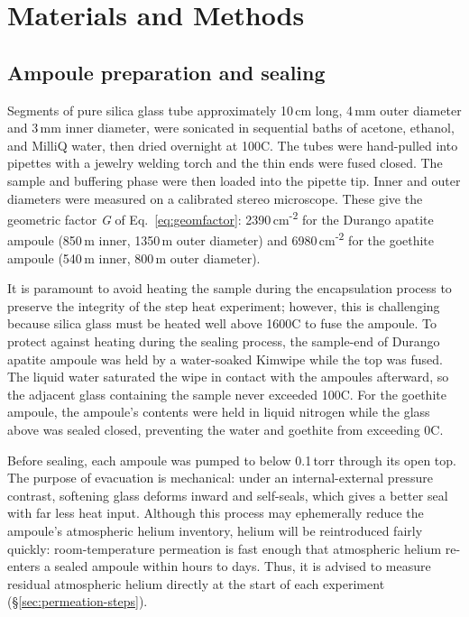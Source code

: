 \section{Materials and Methods}\label{sec:methods}

\subsection{Ampoule preparation and sealing}\label{sec:ampoule-prep}

Segments of pure silica glass tube approximately 10\,cm long, 4\,mm outer diameter and 3\,mm inner diameter, were sonicated in sequential baths of acetone, ethanol, and MilliQ water, then dried overnight at 100\textdegree C. The tubes were hand-pulled into pipettes with a jewelry welding torch and the thin ends were fused closed. The sample and buffering phase were then loaded into the pipette tip. Inner and outer diameters were measured on a calibrated stereo microscope. These give the geometric factor \emph{G} of Eq.~\eqref{eq:geomfactor}: 2390\,cm\textsuperscript{-2} for the Durango apatite ampoule (850\,\textmu m inner, 1350\,\textmu m outer diameter) and 6980\,cm\textsuperscript{-2} for the goethite ampoule (540\,\textmu m inner, 800\,\textmu m outer diameter).

It is paramount to avoid heating the sample during the encapsulation process to preserve the integrity of the step heat experiment; however, this is challenging because silica glass must be heated well above 1600\textdegree C to fuse the ampoule. To protect against heating during the sealing process, the sample-end of Durango apatite ampoule was held by a water-soaked Kimwipe while the top was fused. The liquid water saturated the wipe in contact with the ampoules afterward, so the adjacent glass containing the sample never exceeded 100\textdegree C. For the goethite ampoule, the ampoule's contents were held in liquid nitrogen while the glass above was sealed closed, preventing the water and goethite from exceeding 0\textdegree C.

Before sealing, each ampoule was pumped to below 0.1\,torr through its open top. The purpose of evacuation is mechanical: under an internal-external pressure contrast, softening glass deforms inward and self-seals, which gives a better seal with far less heat input. Although this process may ephemerally reduce the ampoule's atmospheric helium inventory, helium will be reintroduced fairly quickly: room-temperature permeation is fast enough that atmospheric helium re-enters a sealed ampoule within hours to days. Thus, it is advised to measure residual atmospheric helium directly at the start of each experiment (\S\ref{sec:permeation-steps}).

